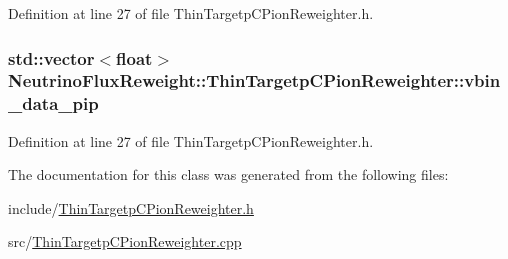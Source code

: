 Definition at line 27 of file Thin\-Targetp\-C\-Pion\-Reweighter.\-h.

\hypertarget{class_neutrino_flux_reweight_1_1_thin_targetp_c_pion_reweighter_a3602ae8237c0cc7729045b13b90874b4}{
\subsubsection[{vbin\-\_\-data\-\_\-pip}]{\setlength{\rightskip}{0pt plus 5cm}std\-::vector$<$float$>$ Neutrino\-Flux\-Reweight\-::\-Thin\-Targetp\-C\-Pion\-Reweighter\-::vbin\-\_\-data\-\_\-pip}}\label{class_neutrino_flux_reweight_1_1_thin_targetp_c_pion_reweighter_a3602ae8237c0cc7729045b13b90874b4}


Definition at line 27 of file Thin\-Targetp\-C\-Pion\-Reweighter.\-h.



The documentation for this class was generated from the following files\-:\begin{DoxyCompactItemize}
\item 
include/\hyperlink{_thin_targetp_c_pion_reweighter_8h}{Thin\-Targetp\-C\-Pion\-Reweighter.\-h}\item 
src/\hyperlink{_thin_targetp_c_pion_reweighter_8cpp}{Thin\-Targetp\-C\-Pion\-Reweighter.\-cpp}\end{DoxyCompactItemize}
